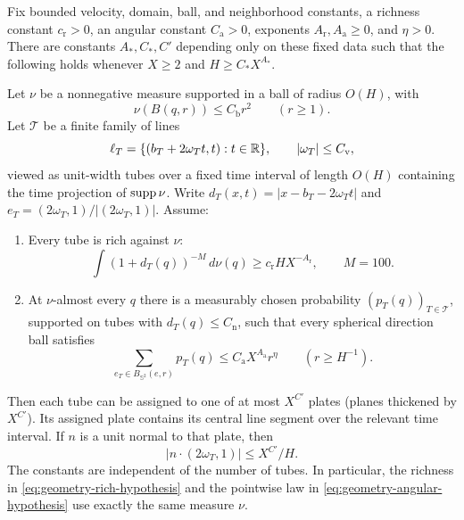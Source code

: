 \begin{proposition}\label{prop:rich}
Fix bounded velocity, domain, ball, and neighborhood constants,
a richness constant $c_{\mathrm r}>0$, an angular constant
$C_{\mathrm a}>0$, exponents $A_{\mathrm r},A_{\mathrm a}\geq0$,
and $\eta>0$.
There are constants $A_*,C_*,C'$ depending only on these fixed data
such that the following holds whenever $X\geq2$ and
$H\geq C_*X^{A_*}$.

Let $\nu$ be a nonnegative measure supported in a ball of radius $O(H)$,
with
\[
 \nu(B(q,r))\leq C_{\mathrm b}r^2\qquad(r\geq1).
\]
Let $\mathcal T$ be a finite family of lines
\[
 \ell_T=\{(b_T+2\omega_Tt,t):t\in\mathbb R\},\qquad
 |\omega_T|\leq C_{\mathrm v},
\]
viewed as unit-width tubes over a fixed time interval of length $O(H)$
containing the time projection of $\operatorname{supp}\nu$. Write
$d_T(x,t)=|x-b_T-2\omega_Tt|$ and
$e_T=(2\omega_T,1)/|(2\omega_T,1)|$. Assume:
\begin{enumerate}[label=\textup{(\roman*)}]
\item Every tube is rich against $\nu$:
\begin{equation}\label{eq:geometry-rich-hypothesis}
 \int (1+d_T(q))^{-M}\,d\nu(q)
 \geq c_{\mathrm r} H X^{-A_{\mathrm r}},\qquad M=100.
\end{equation}
\item At $\nu$-almost every $q$ there is a measurably chosen probability
$(p_T(q))_{T\in\mathcal T}$, supported on tubes with
$d_T(q)\leq C_{\mathrm n}$, such that every spherical direction ball
satisfies
\begin{equation}\label{eq:geometry-angular-hypothesis}
 \sum_{e_T\in B_{\mathbb S^2}(e,r)}p_T(q)
 \leq C_{\mathrm a}X^{A_{\mathrm a}}r^\eta
 \qquad(r\geq H^{-1}).
\end{equation}
\end{enumerate}
Then each tube can be assigned to one of at most $X^{C'}$ plates
(planes thickened by $X^{C'}$). Its assigned plate contains its
central line segment over the relevant time interval. If $n$ is a
unit normal to that plate, then
\begin{equation}\label{eq:src11}
 |n\cdot(2\omega_T,1)|\leq X^{C'}/H.
\end{equation}
The constants are independent of the number of tubes. In particular,
the richness in \eqref{eq:geometry-rich-hypothesis} and the pointwise
law in \eqref{eq:geometry-angular-hypothesis} use exactly the same
measure $\nu$.
\end{proposition}

